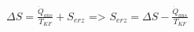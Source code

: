 \( \Delta S = \frac{\dot{Q}_{aus}}{T_{KF}} + S_{erz} \)  
=> \( S_{erz} = \Delta S - \frac{\dot{Q}_{aus}}{T_{KF}} \)